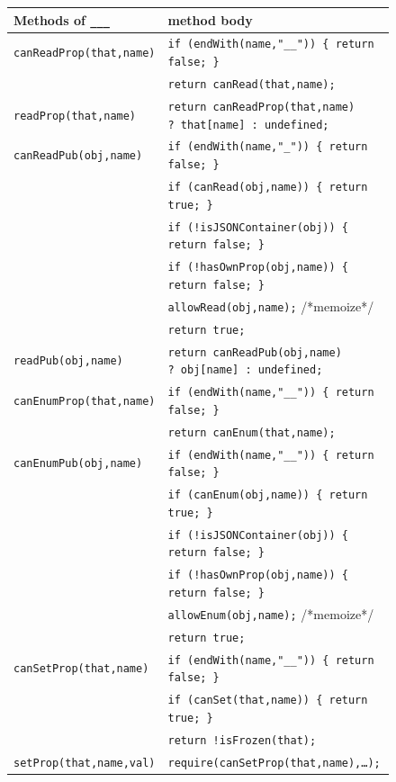 \documentclass[letterpaper,twocolumn,10pt]{article}
\newcommand{\code}[1]{{\tt {#1}}}              %
\begin{document}
\begin{figure}
\begin{tabular}{ll}
  Methods of \code{\_\_\_}  & method body \\ 
  \hline 
  \code{canReadProp(that,name)}
       & \code{if (endWith(name,"\_\_"))\ \{ return false; \}} \\
       & \code{return canRead(that,name);} \\
  \code{readProp(that,name)}
       & \code{return canReadProp(that,name) ?\ that[name] :\ undefined;} \\
  \code{canReadPub(obj,name)}
       & \code{if (endWith(name,"\_"))\ \{ return false; \}} \\
       & \code{if (canRead(obj,name))\ \{ return true; \}} \\
       & \code{if (!isJSONContainer(obj))\ \{ return false; \}} \\
       & \code{if (!hasOwnProp(obj,name))\ \{ return false; \}} \\
       & \code{allowRead(obj,name);} /*memoize*/ \\
       & \code{return true;} \\
  \code{readPub(obj,name)}
       & \code{return canReadPub(obj,name) ?\ obj[name] :\ undefined;} \\
  \hline
  \code{canEnumProp(that,name)} 
       & \code{if (endWith(name,"\_\_"))\ \{ return false; \}} \\
       & \code{return canEnum(that,name);} \\
  \code{canEnumPub(obj,name)}
       & \code{if (endWith(name,"\_\_"))\ \{ return false; \}} \\
       & \code{if (canEnum(obj,name))\ \{ return true; \}} \\
       & \code{if (!isJSONContainer(obj))\ \{ return false; \}} \\
       & \code{if (!hasOwnProp(obj,name))\ \{ return false; \}} \\
       & \code{allowEnum(obj,name);} /*memoize*/ \\
       & \code{return true;} \\
  \hline
  \code{canSetProp(that,name)}
       & \code{if (endWith(name,"\_\_"))\ \{ return false; \}} \\
       & \code{if (canSet(that,name))\ \{ return true; \}} \\
       & \code{return !isFrozen(that);} \\
  \code{setProp(that,name,val)}
       & \code{require(canSetProp(that,name),\ldots);} \\

\end{tabular}
\end{figure}
\end{document}
